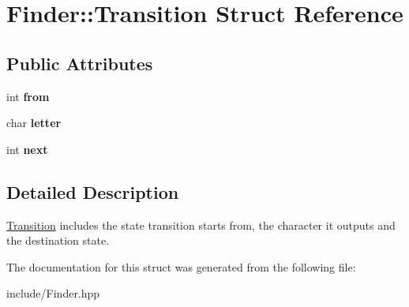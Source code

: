 \hypertarget{structFinder_1_1Transition}{}\section{Finder\+:\+:Transition Struct Reference}
\label{structFinder_1_1Transition}
\subsection*{Public Attributes}
\begin{DoxyCompactItemize}
\item 
\mbox{\label{structFinder_1_1Transition_ab1ec39d36442158986c61aab679a8e34}} 
int {\bfseries from}
\item 
\mbox{\label{structFinder_1_1Transition_ad3a3f4fa067343912a8001e695e78770}} 
char {\bfseries letter}
\item 
\mbox{\label{structFinder_1_1Transition_a87261e26859b12838fa811a5879f7fb9}} 
int {\bfseries next}
\end{DoxyCompactItemize}


\subsection{Detailed Description}
\hyperlink{structFinder_1_1Transition}{Transition} includes the state transition starts from, the character it outputs and the destination state. 

The documentation for this struct was generated from the following file\+:\begin{DoxyCompactItemize}
\item 
include/Finder.\+hpp\end{DoxyCompactItemize}
